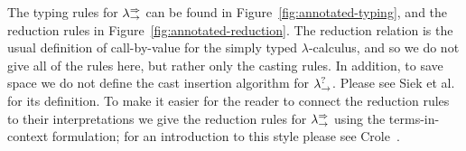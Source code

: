 The typing rules for $\lambda^{\Rightarrow}_\to$ can be found in
Figure~\ref{fig:annotated-typing}, and the reduction rules in
Figure~\ref{fig:annotated-reduction}. The reduction relation is the
usual definition of call-by-value for the simply typed
$\lambda$-calculus, and so we do not give all of the rules here, but
rather only the casting rules.  In addition, to save space we do not
define the cast insertion algorithm for $\lambda^?_\to$.  Please see Siek et
al.~\cite{Siek:2015} for its definition.  To make it easier for the
reader to connect the reduction rules to their interpretations we give
the reduction rules for $\lambda^{\Rightarrow}_\to$ using the terms-in-context
formulation; for an introduction to this style please see
Crole~\cite{Crole:1994}.

